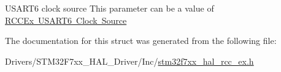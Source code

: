 U\+S\+A\+R\+T6 clock source This parameter can be a value of \mbox{\hyperlink{group___r_c_c_ex___u_s_a_r_t6___clock___source}{R\+C\+C\+Ex U\+S\+A\+R\+T6 Clock Source}} 

The documentation for this struct was generated from the following file\+:\begin{DoxyCompactItemize}
\item 
Drivers/\+S\+T\+M32\+F7xx\+\_\+\+H\+A\+L\+\_\+\+Driver/\+Inc/\mbox{\hyperlink{stm32f7xx__hal__rcc__ex_8h}{stm32f7xx\+\_\+hal\+\_\+rcc\+\_\+ex.\+h}}\end{DoxyCompactItemize}
